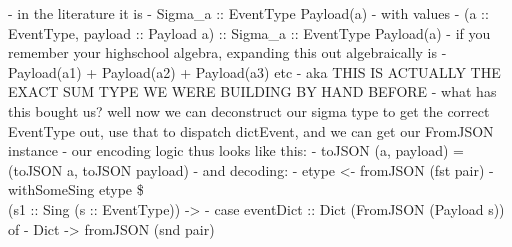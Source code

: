     - in the literature it is
    - Sigma_{a :: EventType} Payload(a)
      - with values
      - (a :: EventType, payload :: Payload a) :: Sigma_{a :: EventType} Payload(a)
    - if you remember your highschool algebra, expanding this out algebraically is
    - Payload(a1) + Payload(a2) + Payload(a3) etc
    - aka THIS IS ACTUALLY THE EXACT SUM TYPE WE WERE BUILDING BY HAND BEFORE
  - what has this bought us? well now we can deconstruct our sigma type to get the correct EventType out, use that to dispatch dictEvent, and we can get our FromJSON instance
  - our encoding logic thus looks like this:
    - toJSON (a, payload) = (toJSON a, toJSON payload)
  - and decoding:
    - etype <- fromJSON (fst pair)
    - withSomeSing etype \$ \\(s1 :: Sing (s :: EventType)) ->
      - case eventDict :: Dict (FromJSON (Payload s)) of
        - Dict -> fromJSON (snd pair)

